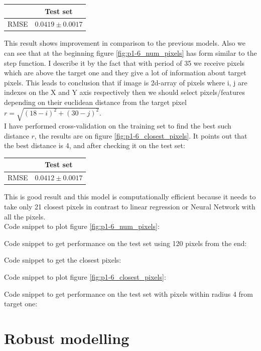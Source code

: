 \documentclass{article}
\begin{document}
			\begin{center}
				\begin{tabular}{| c | c | }
					\hline
					\, &  Test set \\ \hline
					RMSE & $0.0419 \pm 0.0017$ \\ 
					\hline
				\end{tabular}
			\end{center}
			
			This result shows improvement in comparison to the previous models. Also we can see that at the beginning figure \ref{fig:p1-6_num_pixels} has form similar to the step function. I describe it by the fact that with period of 35 we receive pixels which are above the target one and they give a lot of information about target pixels. This leads to conclusion that if image is 2d-array of pixels where i, j are indexes on the X and Y axis respectively then we should select pixels/features depending on their euclidean distance from the target pixel $r = \sqrt{(18 - i)^2 + (30 - j)^2}$. \\
			 I have performed cross-validation on the training set to find the best such distance $r$, the results are on figure \ref{fig:p1-6_closest_pixels}. It points out that the best distance is 4, and after checking it on the test set:
			\begin{center}
				\begin{tabular}{| c | c |}
					\hline
					\, &  Test set \\ \hline
					RMSE & $0.0412 \pm 0.0017$ \\ 
					\hline
				\end{tabular}
			\end{center}
			This is good result and this model is computationally efficient because it needs to take only 21 closest pixels in contrast to linear regression or Neural Network with all the pixels. \\ 
			Code snippet to plot figure \ref{fig:p1-6_num_pixels}:
			
			Code snippet to get performance on the test set using 120 pixels from the end:
			
			Code snippet to get the closest pixels:
			
			Code snippet to plot figure \ref{fig:p1-6_closest_pixels}:
			
			Code snippet to get performance on the test set with pixels within radius 4 from target one:
			
			\newpage
			
		\section{Robust modelling}
\end{document}
